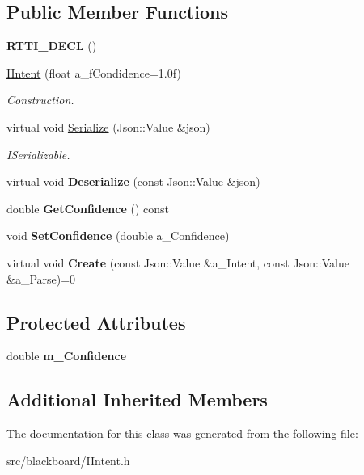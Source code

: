 \subsection*{Public Member Functions}
\begin{DoxyCompactItemize}
\item 
\mbox{\label{class_i_intent_aca04e18b51f2bdc2144cd67663fc6387}} 
{\bfseries R\+T\+T\+I\+\_\+\+D\+E\+CL} ()
\item 
\mbox{\label{class_i_intent_a08d72267388eadc85428b0dd6e0cd2f6}} 
\hyperlink{class_i_intent_a08d72267388eadc85428b0dd6e0cd2f6}{I\+Intent} (float a\+\_\+f\+Condidence=1.\+0f)
\begin{DoxyCompactList}\small\item\em Construction. \end{DoxyCompactList}\item 
\mbox{\label{class_i_intent_ad83df4bc7196a89f91cd439df7bb7dcd}} 
virtual void \hyperlink{class_i_intent_ad83df4bc7196a89f91cd439df7bb7dcd}{Serialize} (Json\+::\+Value \&json)
\begin{DoxyCompactList}\small\item\em I\+Serializable. \end{DoxyCompactList}\item 
\mbox{\label{class_i_intent_a580301ed11679bc7e07e29c68e6030ba}} 
virtual void {\bfseries Deserialize} (const Json\+::\+Value \&json)
\item 
\mbox{\label{class_i_intent_a79c009788bf811866639bd57292420a6}} 
double {\bfseries Get\+Confidence} () const
\item 
\mbox{\label{class_i_intent_a2f63629fca41719474f8f445c6aea86d}} 
void {\bfseries Set\+Confidence} (double a\+\_\+\+Confidence)
\item 
\mbox{\label{class_i_intent_a39b1efbdcfde15fb66513d1f9d867a1e}} 
virtual void {\bfseries Create} (const Json\+::\+Value \&a\+\_\+\+Intent, const Json\+::\+Value \&a\+\_\+\+Parse)=0
\end{DoxyCompactItemize}
\subsection*{Protected Attributes}
\begin{DoxyCompactItemize}
\item 
\mbox{\label{class_i_intent_ae225b8fc6856c1f88641f5c2dd3d0b31}} 
double {\bfseries m\+\_\+\+Confidence}
\end{DoxyCompactItemize}
\subsection*{Additional Inherited Members}


The documentation for this class was generated from the following file\+:\begin{DoxyCompactItemize}
\item 
src/blackboard/I\+Intent.\+h\end{DoxyCompactItemize}
